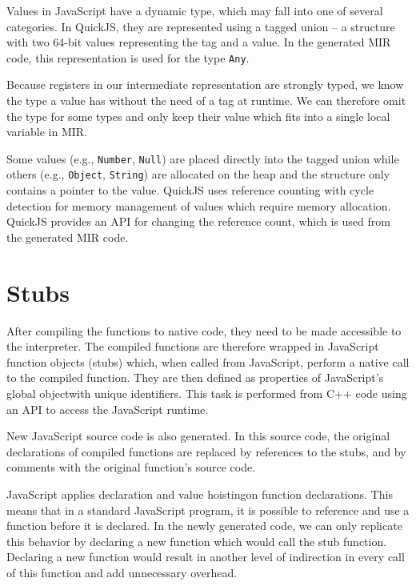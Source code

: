 Values in JavaScript have a dynamic type, which may fall into one of several categories. In QuickJS, they are represented using a tagged union -- a structure with two 64-bit values representing the tag and a value. In the generated MIR code, this representation is used for the type \texttt{Any}.

Because registers in our intermediate representation are strongly typed, we know the type a value has without the need of a tag at runtime. We can therefore omit the type for some types and only keep their value which fits into a single local variable in MIR.

Some values (e.g., \texttt{Number}, \texttt{Null}) are placed directly into the tagged union while others (e.g., \texttt{Object}, \texttt{String}) are allocated on the heap and the structure only contains a pointer to the value. QuickJS uses reference counting with cycle detection for memory management of values which require memory allocation. QuickJS provides an API for changing the reference count, which is used from the generated MIR code.


\section{Stubs}\label{impl:stubs}

After compiling the functions to native code, they need to be made accessible to the interpreter. The compiled functions are therefore wrapped in JavaScript function objects (stubs) which, when called from JavaScript, perform a native call to the compiled function. They are then defined as properties of JavaScript's global object\footnotemark[1] with unique identifiers. This task is performed from C++ code using an API to access the JavaScript runtime.


New JavaScript source code is also generated. In this source code, the original declarations of compiled functions are replaced by references to the stubs, and by comments with the original function's source code.

JavaScript applies declaration and value hoisting\footnotemark[2] on function declarations. This means that in a standard JavaScript program, it is possible to reference and use a function before it is declared. In the newly generated code, we can only replicate this behavior by declaring a new function which would call the stub function. Declaring a new function would result in another level of indirection in every call of this function and add unnecessary overhead.


